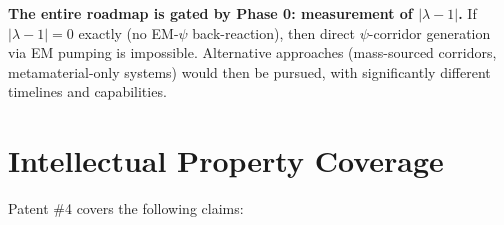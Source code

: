 \documentclass[11pt,a4paper]{article}
\begin{document}
\begin{tcolorbox}[colback=red!5!white, colframe=red!60!black, title=Critical Path Item]
\textbf{The entire roadmap is gated by Phase 0: measurement of $|\lambda - 1|$.}
If $|\lambda - 1| = 0$ exactly (no EM-$\psi$ back-reaction), then direct
$\psi$-corridor generation via EM pumping is impossible. Alternative
approaches (mass-sourced corridors, metamaterial-only systems) would then
be pursued, with significantly different timelines and capabilities.
\end{tcolorbox}

\section{Intellectual Property Coverage}

Patent \#4 covers the following claims:
\end{document}
